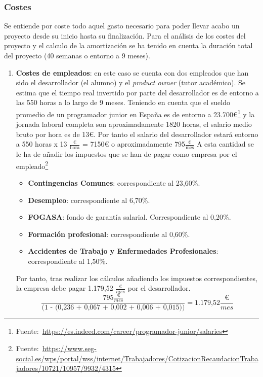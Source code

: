 \subsubsection{Costes}
Se entiende por coste todo aquel gasto necesario para poder llevar acabo un proyecto desde su inicio hasta su finalización. Para el análisis de los costes del proyecto y el calculo de la amortización se ha tenido en cuenta la duración total del proyecto (40 semanas o entorno a 9 meses).
\begin{enumerate}
\item \textbf{Costes de empleados}: en este caso se cuenta con dos empleados que han sido el desarrollador (el alumno) y el \textit{product owner} (tutor académico).
Se estima que el tiempo real invertido por parte del desarrollador es de entorno a las 550 horas a lo largo de 9 meses. Teniendo en cuenta que el sueldo promedio de un programador junior en España es de entorno a 23.700€\footnote{Fuente:~\url{https://es.indeed.com/career/programador-junior/salaries}} y la jornada laboral completa son aproximadamente 1820 horas, el salario medio bruto por hora es de 13€. Por tanto el salario del desarrollador estará entorno a 550 horas x 13 \(\frac{\text{€}}{\text{hora}}\) = 7150€ o aproximadamente 795\(\frac{\text{€}}{\text{mes}}\)
A esta cantidad se le ha de añadir los impuestos que se han de pagar como empresa por el empleado\footnote{Fuente:~\url{https://www.seg-social.es/wps/portal/wss/internet/Trabajadores/CotizacionRecaudacionTrabajadores/10721/10957/9932/4315}}
\begin{itemize}
\item \textbf{Contingencias Comunes}: correspondiente al 23,60\%.
\item \textbf{Desempleo}: correspondiente al 6,70\%.
\item \textbf{FOGASA}: fondo de garantía salarial. Correspondiente al 0,20\%.
\item \textbf{Formación profesional}: correspondiente al 0,60\%.
\item \textbf{Accidentes de Trabajo y Enfermedades Profesionales}: correspondiente al 1,50\%.
\end{itemize}
Por tanto, tras realizar los cálculos añadiendo los impuestos correspondientes, la empresa debe pagar 1.179,52 \(\frac{\text{€}}{mes}\) por el desarrollador.
\begin{equation}
\frac{795\frac{\text{€}}{mes}}{\text{(1 - (0,236 + 0,067 + 0,002 + 0,006 + 0,015))}} = \text{1.179,52} \frac{\text{€}}{mes}
\end{equation}


\end{enumerate}

